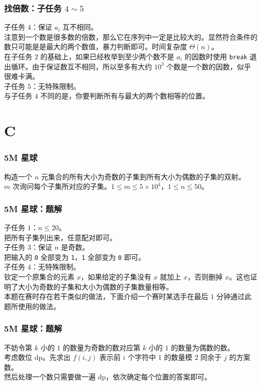 \documentclass{beamer}
\begin{document}
\begin{frame}
\frametitle{找倍数：子任务 $4 \sim 5$}
子任务 $4$：保证 $a_i$ 互不相同。\\
\pause
注意到一个数是很多数的倍数，那么它在序列中一定是比较大的。显然符合条件的数只可能是是最大的两个数值，暴力判断即可。时间复杂度 $\Theta(n)$。\\
\pause
在子任务 $2$ 的基础上，如果已经枚举到至少两个数不是 $a_i$ 的因数时使用 \texttt{break} 退出循环。由于保证数互不相同，所以至多有大约 $10^3$ 个数是一个数的因数，似乎很难卡满。\\
\pause
子任务 $5$：无特殊限制。\\
\pause
与子任务 $4$ 不同的是，你要判断所有与最大的两个数相等的位置。
\end{frame}

\section{C}

\begin{frame}
\frametitle{5M 星球}
构造一个 $n$ 元集合的所有大小为奇数的子集到所有大小为偶数的子集的双射。\\
$m$ 次询问每个子集所对应的子集。$1 \leq m \leq 5 \times 10^4$，$1 \leq n \leq 50$。
\end{frame}

\begin{frame}
\frametitle{5M 星球：题解}
子任务 $1$：$n \leq 20$。\\
\pause
把所有子集列出来，任意配对即可。\\
\pause
子任务 $3$：保证 $n$ 是奇数。\\
\pause
把输入的 \texttt{0} 全部变为 \texttt{1}，\texttt{1} 全部变为 \texttt{0} 即可。\\
\pause
子任务 $4$：无特殊限制。\\
\pause
钦定一个原集合的元素 $x$，如果给定的子集没有 $x$ 就加上 $x$，否则删掉 $x$。这也证明了大小为奇数的子集和大小为偶数的子集数量相等。\\
\pause
本题在赛时存在若干类似的做法，下面介绍一个赛时某选手在最后 $1$ 分钟通过此题所使用的做法。
\end{frame}

\begin{frame}
\frametitle{5M 星球：题解}
不妨令第 $k$ 小的 $1$ 的数量为奇数的数对应第 $k$ 小的 $1$ 的数量为偶数的数。\\
\pause
考虑数位 dp。先求出 $f(i, j)$ 表示前 $i$ 个字符中 $1$ 的数量模 $2$ 同余于 $j$ 的方案数。\\
\pause
然后处理一个数只需要做一遍 dp，依次确定每个位置的答案即可。
\end{frame}
\end{document}
